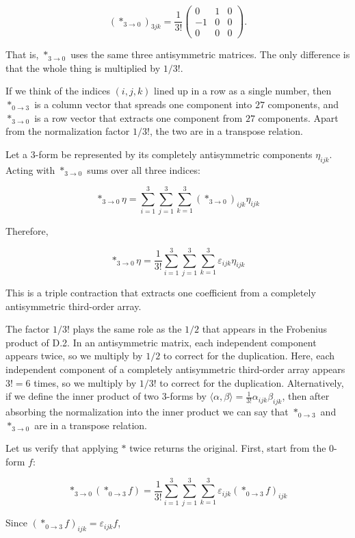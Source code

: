 \documentclass[a4paper,12pt,openany]{book}
\begin{document}
\[
(\ast_{3\to0})_{3jk}
=
\frac{1}{3!}
\begin{pmatrix}
0&1&0\\
-1&0&0\\
0&0&0
\end{pmatrix}.
\]

That is, \(\ast_{3\to0}\) uses the same three antisymmetric matrices.
The only difference is that the whole thing is multiplied by \(1/3!\).

If we think of the indices \((i,j,k)\) lined up in a row as a single
number, then \(\ast_{0\to3}\) is a column vector that spreads one
component into \(27\) components, and \(\ast_{3\to0}\) is a row vector
that extracts one component from \(27\) components. Apart from the
normalization factor \(1/3!\), the two are in a transpose relation.

Let a \(3\)-form be represented by its completely antisymmetric
components \(\eta_{ijk}\). Acting with \(\ast_{3\to0}\) sums over all
three indices:

\[
\ast_{3\to0}\eta
=
\sum_{i=1}^{3}
\sum_{j=1}^{3}
\sum_{k=1}^{3}
(\ast_{3\to0})_{ijk}\eta_{ijk}
\]

Therefore,

\[
\ast_{3\to0}\eta
=
\frac{1}{3!}
\sum_{i=1}^{3}
\sum_{j=1}^{3}
\sum_{k=1}^{3}
\varepsilon_{ijk}\eta_{ijk}
\]

This is a triple contraction that extracts one coefficient from a
completely antisymmetric third-order array.

The factor \(1/3!\) plays the same role as the \(1/2\) that appears in
the Frobenius product of D.2. In an antisymmetric matrix, each
independent component appears twice, so we multiply by \(1/2\) to
correct for the duplication. Here, each independent component of a
completely antisymmetric third-order array appears \(3!=6\) times, so we
multiply by \(1/3!\) to correct for the duplication. Alternatively, if
we define the inner product of two \(3\)-forms by
\(\langle\alpha,\beta\rangle = \frac{1}{3!}\alpha_{ijk}\beta_{ijk}\),
then after absorbing the normalization into the inner product we can say
that \(\ast_{0\to3}\) and \(\ast_{3\to0}\) are in a transpose relation.

Let us verify that applying \(\ast\) twice returns the original. First,
start from the \(0\)-form \(f\):

\[
\ast_{3\to0}(\ast_{0\to3}f)
=
\frac{1}{3!}
\sum_{i=1}^{3}
\sum_{j=1}^{3}
\sum_{k=1}^{3}
\varepsilon_{ijk}(\ast_{0\to3}f)_{ijk}
\]

Since \((\ast_{0\to3}f)_{ijk}=\varepsilon_{ijk}f\),
\end{document}
